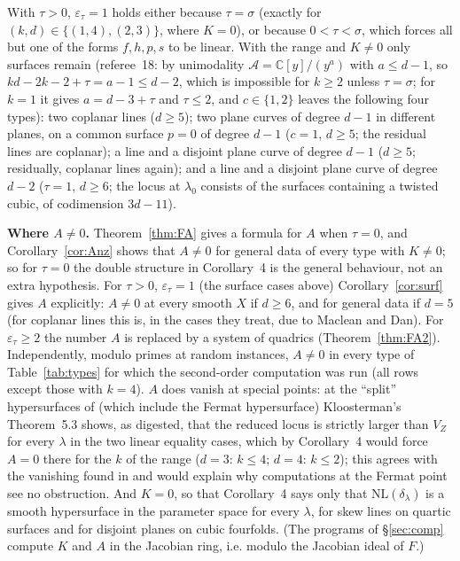 \documentclass[11pt]{article}
\numberwithin{equation}{section}
\theoremstyle{remark}
\newcommand{\CC}{\mathbb{C}}
\newcommand{\NL}{\mathrm{NL}}
\newcommand{\VZ}{V_Z}
\newcommand{\cA}{\mathcal{A}}
\newcommand{\lz}{\lambda_0}
\newcommand{\et}{\varepsilon_\tau}
\newcommand{\run}[1]{\medskip\noindent\textbf{#1}}
\begin{document}
With $\tau>0$, $\et=1$ holds either because $\tau=\sigma$ (exactly for $(k,d)\in\{(1,4),(2,3)\}$, where $K=0$), or
because $0<\tau<\sigma$, which forces all but one of the forms $f,h,p,s$ to be linear. With the range and $K\ne0$
only surfaces remain (referee~18: by unimodality $\cA=\CC[y]/(y^a)$ with $a\le d-1$, so
$kd-2k-2+\tau=a-1\le d-2$, which is impossible for $k\ge2$ unless $\tau=\sigma$; for $k=1$ it gives $a=d-3+\tau$
and $\tau\le2$, and $c\in\{1,2\}$ leaves the following four types): two coplanar lines ($d\ge5$); two
plane curves of degree $d-1$ in different planes, on a common surface $p=0$ of degree $d-1$ ($c=1$, $d\ge5$; the
residual lines are coplanar); a line and a disjoint plane curve of degree $d-1$ ($d\ge5$; residually, coplanar
lines again); and a line and a disjoint plane curve of degree $d-2$ ($\tau=1$, $d\ge6$; the locus at $\lz$
consists of the surfaces containing a twisted cubic, of codimension $3d-11$).

\run{Where $A\neq0$.} Theorem~\ref{thm:FA} gives a formula for $A$ when $\tau=0$, and
Corollary~\ref{cor:Anz} shows that $A\ne0$ for general data of every type with $K\ne0$; so for
$\tau=0$ the double structure in Corollary~4 is the general behaviour, not an extra hypothesis. For $\tau>0$,
$\et=1$ (the surface cases above) Corollary~\ref{cor:surf} gives $A$ explicitly: $A\ne0$ at every smooth $X$ if $d\ge6$, and for
general data if $d=5$
(for coplanar lines this is, in the cases they treat, due to Maclean and Dan). For $\et\ge2$ the number $A$ is
replaced by a system of quadrics (Theorem~\ref{thm:FA2}). Independently, modulo primes at
random instances, $A\ne0$ in every type of Table~\ref{tab:types} for which the second-order computation was run
(all rows except those with $k=4$). $A$ does vanish at special points: at the ``split'' hypersurfaces
of \cite[Def.~5.1]{Kl} (which include the Fermat hypersurface) Kloosterman's Theorem~5.3 shows, as digested,
that the reduced locus is strictly larger than $\VZ$ for every $\lambda$ in the two linear equality cases, which
by Corollary~4 would force $A=0$ there for the $k$ of the range ($d=3$: $k\le4$; $d=4$: $k\le2$); this agrees with the vanishing found in \cite{P1,P2} and would explain
why computations at the Fermat point \cite{Mo,Mo26} see no obstruction. And $K=0$, so that Corollary~4 says only
that $\NL(\delta_\lambda)$ is a smooth hypersurface in the parameter space for every $\lambda$, for skew lines on
quartic surfaces and for disjoint planes on cubic fourfolds. (The programs of \S\ref{sec:comp} compute $K$ and
$A$ in the Jacobian ring, i.e. modulo the Jacobian ideal of $F$.)
\end{document}
